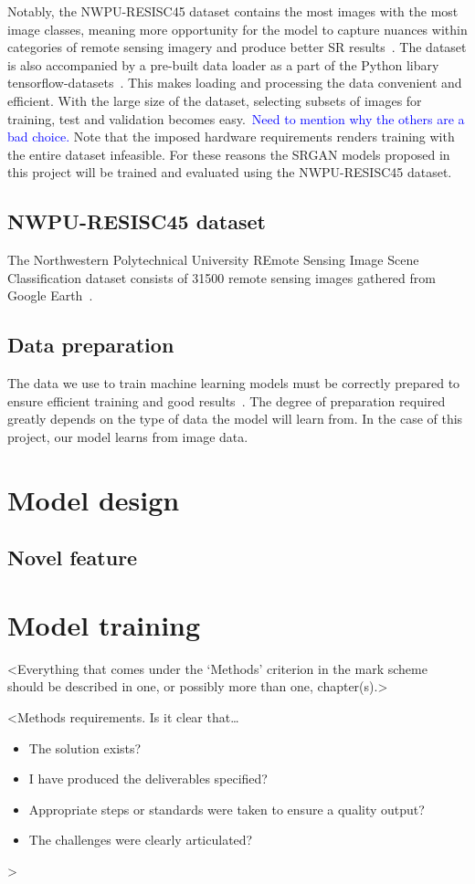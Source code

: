Notably, the NWPU-RESISC45 dataset contains the most images with the most image classes, meaning more opportunity for the model to capture nuances within categories of remote sensing imagery and produce better SR results~\cite{ref}. The dataset is also accompanied by a pre-built data loader as a part of the Python libary tensorflow-datasets~\cite{ref}. This makes loading and processing the data convenient and efficient. With the large size of the dataset, selecting subsets of images for training, test and validation becomes easy.\ \textcolor{blue}{Need to mention why the others are a bad choice.} Note that the imposed hardware requirements renders training with the entire dataset infeasible. For these reasons the SRGAN models proposed in this project will be trained and evaluated using the NWPU-RESISC45 dataset.

\subsection{NWPU-RESISC45 dataset}
The Northwestern Polytechnical University REmote Sensing Image Scene Classification dataset consists of 31500 remote sensing images gathered from Google Earth~\cite{resisc45}. 

\subsection{Data preparation}
The data we use to train machine learning models must be correctly prepared to ensure efficient training and good results~\cite{ref}. The degree of preparation required greatly depends on the type of data the model will learn from. In the case of this project, our model learns from image data.

\section{Model design}
\lipsum[7]

\subsection{Novel feature}
\lipsum[8]

\section{Model training}
\lipsum[9]

<Everything that comes under the `Methods' criterion in the mark scheme should be described in one, or possibly more than one, chapter(s).>

<Methods requirements. Is it clear that\dots
\begin{itemize}
    \item The solution exists?
    \item I have produced the deliverables specified?
    \item Appropriate steps or standards were taken to ensure a quality output?
    \item The challenges were clearly articulated?
\end{itemize}
>
